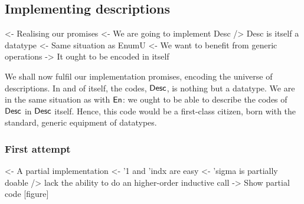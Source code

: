\subsection{Implementing descriptions}

\begin{wstructure}
<- Realising our promises
    <- We are going to implement Desc
    /> Desc is itself a datatype
        <- Same situation as EnumU
            <- We want to benefit from generic operations
        -> It ought to be encoded in itself
\end{wstructure}

We shall now fulfil our implementation promises, encoding the universe
of descriptions. In and of itself, the codes, $\Desc$, is nothing but
a datatype. We are in the same situation as with $\EnumU$: we ought to
be able to describe the codes of $\Desc$ in $\Desc$ itself. Hence,
this code would be a first-class citizen, born with the standard,
generic equipment of datatypes.

\subsubsection{First attempt}

\begin{wstructure}
<- A partial implementation
    <- '1 and 'indx are easy
    <- 'sigma is partially doable
        /> lack the ability to do an higher-order inductive call
    -> Show partial code [figure]
\end{wstructure}

